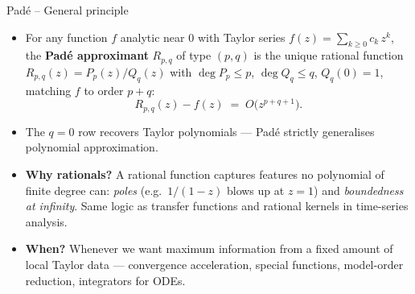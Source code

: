 \documentclass[11pt,aspectratio=169]{beamer}
\begin{document}
\begin{frame}{Padé -- General principle}

\begin{itemize}

\item For any function $f$ analytic near $0$ with Taylor series
  $f(z) = \sum_{k\ge 0} c_k\, z^k$, the \textbf{Padé approximant}
  $R_{p,q}$ of type $(p,q)$ is the unique rational function
  $R_{p,q}(z) = P_p(z)/Q_q(z)$ with $\deg P_p \le p$, $\deg Q_q \le q$,
  $Q_q(0)=1$, matching $f$ to order $p+q$:
  \[
  R_{p,q}(z) - f(z) \;=\; O\bigl(z^{p+q+1}\bigr).
  \]

\item The $q=0$ row recovers Taylor polynomials — Padé strictly
  generalises polynomial approximation.\newline

\item \textbf{Why rationals?} A rational function captures features
  no polynomial of finite degree can: \emph{poles} (e.g.\ $1/(1-z)$
  blows up at $z=1$) and \emph{boundedness at infinity}. Same logic
  as transfer functions and rational kernels in time-series
  analysis.\newline

\item \textbf{When?} Whenever we want maximum information from a fixed
  amount of local Taylor data — convergence acceleration, special
  functions, model-order reduction, integrators for ODEs.

\end{itemize}

\end{frame}
\end{document}
